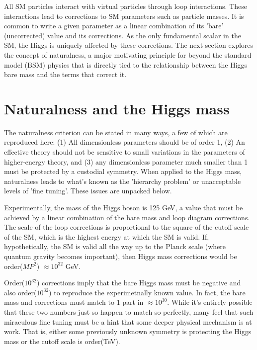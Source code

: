 \documentclass[12pt]{article}
\begin{document}
    All SM particles interact with virtual particles through loop interactions. These interactions lead to corrections to SM parameters such as particle masses. It is common to write a given parameter as a linear combination of its 'bare' (uncorrected) value and its corrections. As the only fundamental scalar in the SM, the Higgs is uniquely affected by these corrections. The next section explores the concept of naturalness, a major motivating principle for beyond the standard model (BSM) physics that is directly tied to the relationship between the Higgs bare mass and the terms that correct it.

\section{Naturalness and the Higgs mass}
    The naturalness criterion can be stated in many ways, a few of which are reproduced here: (1) All dimensionless parameters should be of order 1, (2) An effective theory should not be sensitive to small variations in the parameters of higher-energy theory, and (3) any dimensionless parameter much smaller than 1 must be protected by a custodial symmetry. When applied to the Higgs mass, naturalness leads to what's known as the 'hierarchy problem' or unacceptable levels of 'fine tuning'. These issues are unpacked below.

    Experimentally, the mass of the Higgs boson is 125 GeV, a value that must be achieved by a linear combination of the bare mass and loop diagram corrections. The scale of the loop corrections is proportional to the square of the cutoff scale of the SM, which is the highest energy at which the SM is valid. If, hypothetically, the SM is valid all the way up to the Planck scale (where quantum gravity becomes important), then Higgs mass corrections would be order($MP^2$) $\approx 10^{32}$ GeV.
    
    Order($10^{32}$) corrections imply that the bare Higgs mass must be negative and also order($10^{32}$) to reproduce the experimetnally known value. In fact, the bare mass and corrections must match to 1 part in $\approx 10^{30}$. While it's entirely possible that these two numbers just so happen to match so perfectly, many  feel that such miraculous fine tuning must be a hint that some deeper physical mechanism is at work. That is, either some previously unknown symmetry is protecting the Higgs mass or the cutoff scale is order(TeV).
\end{document}
